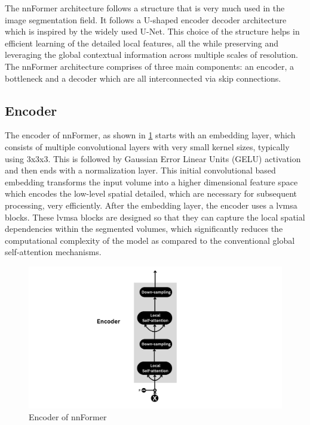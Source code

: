 The nnFormer architecture follows a structure that is very much used in the image segmentation field. It follows a U-shaped encoder decoder architecture which is inspired by the widely used U-Net. This choice of the structure helps in efficient learning of the detailed local features, all the while preserving and leveraging the global contextual information across multiple scales of resolution. The nnFormer architecture comprises of three main components: an encoder, a bottleneck and a decoder which are all interconnected via skip connections.

\subsection{Encoder}
The encoder of nnFormer, as shown in \cref{Fig:encoder} starts with an embedding layer, which consists of multiple convolutional layers with very small kernel sizes, typically using 3x3x3. This is followed by Gaussian Error Linear Units (GELU) activation and then ends with a normalization layer. This initial convolutional based embedding transforms the input volume into a higher dimensional feature space which encodes the low-level spatial detailed, which are necessary for subsequent processing, very efficiently. After the embedding layer, the encoder uses a \gls{lvmsa} blocks. These \gls{lvmsa} blocks are designed so that they can capture the local spatial dependencies within the segmented volumes, which significantly reduces the computational complexity of the model as compared to the conventional global self-attention mechanisms. 

\begin{figure}[htb!] %
\centering
\centering
\includegraphics[width=1\textwidth]{images/Encoder.png}
\caption{\centering Encoder of nnFormer}
\label{Fig:encoder}
\end{figure}

